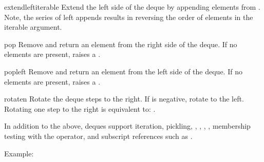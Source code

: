 \begin{methoddesc}{extendleft}{iterable}
   Extend the left side of the deque by appending elements from
   .  Note, the series of left appends results in
   reversing the order of elements in the iterable argument.
\end{methoddesc}

\begin{methoddesc}{pop}{}
   Remove and return an element from the right side of the deque.
   If no elements are present, raises a .
\end{methoddesc}

\begin{methoddesc}{popleft}{}
   Remove and return an element from the left side of the deque.
   If no elements are present, raises a .   
\end{methoddesc}

\begin{methoddesc}{rotate}{n}
   Rotate the deque  steps to the right.  If  is
   negative, rotate to the left.  Rotating one step to the right
   is equivalent to:  . 
\end{methoddesc}

In addition to the above, deques support iteration, pickling, ,
, , ,
membership testing with the  operator, and subscript references
such as .

Example:

